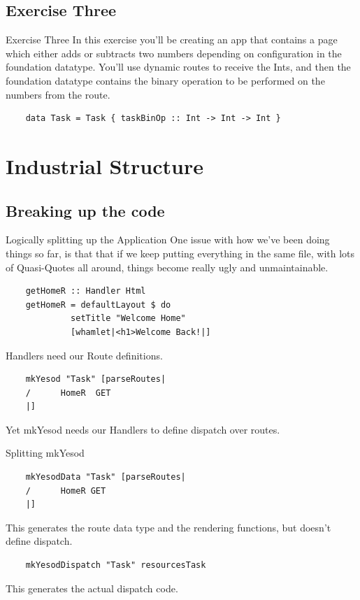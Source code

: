 \documentclass[pdf]{beamer}
\begin{document}
\subsection{Exercise Three}
\begin{frame}[fragile]{Exercise Three}
  In this exercise you'll be creating an app that contains a page
  which either adds or subtracts two numbers depending on
  configuration in the foundation datatype. You'll use dynamic routes
  to receive the Ints, and then the foundation datatype contains the
  binary operation to be performed on the numbers from the route.

  \begin{verbatim}
    data Task = Task { taskBinOp :: Int -> Int -> Int }
  \end{verbatim}
\end{frame}

\section{Industrial Structure}
\subsection{Breaking up the code}
\begin{frame}[fragile]{Logically splitting up the Application}
  One issue with how we've been doing things so far, is that that if
  we keep putting everything in the same file, with lots of
  Quasi-Quotes all around, things become really ugly and unmaintainable.

  \begin{verbatim}
    getHomeR :: Handler Html
    getHomeR = defaultLayout $ do
             setTitle "Welcome Home"
             [whamlet|<h1>Welcome Back!|]
  \end{verbatim}

  Handlers need our Route definitions.

  \begin{verbatim}
    mkYesod "Task" [parseRoutes|
    /      HomeR  GET
    |]
  \end{verbatim}
  Yet mkYesod needs our Handlers to define dispatch over routes.
\end{frame}

\begin{frame}[fragile]{Splitting mkYesod}
  \begin{verbatim}
    mkYesodData "Task" [parseRoutes|
    /      HomeR GET
    |]
  \end{verbatim}
  This generates the route data type and the rendering functions, but
  doesn't define dispatch.
  \begin{verbatim}
    mkYesodDispatch "Task" resourcesTask
  \end{verbatim}
  This generates the actual dispatch code.
\end{frame}
\end{document}
